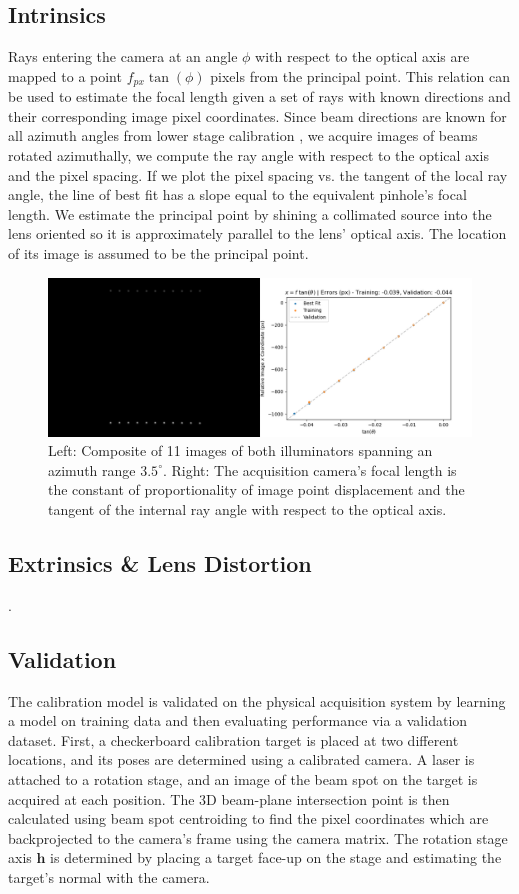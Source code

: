 \subsection{Intrinsics}
Rays entering the camera at an angle $\phi$ with respect to the optical axis are mapped to a point $f_{px} \tan(\phi)$ pixels from the principal point. This relation can be used to estimate the focal length given a set of rays with known directions and their corresponding image pixel coordinates. Since beam directions are known for all azimuth angles from lower stage calibration , we acquire images of beams rotated azimuthally, we compute the ray angle with respect to the optical axis and the pixel spacing. If we plot the pixel spacing vs. the tangent of the local ray angle, the line of best fit has a slope equal to the equivalent pinhole's focal length. We estimate the principal point by shining a collimated source into the lens oriented so it is approximately parallel to the lens' optical axis. The location of its image is assumed to be the principal point.
\begin{figure}
    \centering
    \includegraphics[width=0.75\linewidth]{figures/focal_length_estimate.png}
    \caption{Left: Composite of 11 images of both illuminators spanning an azimuth range $3.5^\circ$. Right: The acquisition camera's focal length is the constant of proportionality of image point displacement and the tangent of the internal ray angle with respect to the optical axis.}
    \label{fig:focal_length_estimate}
\end{figure}

\subsection{Extrinsics \& Lens Distortion}
.

\subsection{Validation}
The calibration model is validated on the physical acquisition system by learning a model on training data and then evaluating performance via a validation dataset. First, a checkerboard calibration target is placed at two different locations, and its poses are determined using a calibrated camera. A laser is attached to a rotation stage, and an image of the beam spot on the target is acquired at each position. The 3D beam-plane intersection point is then calculated using beam spot centroiding to find the pixel coordinates which are backprojected to the camera's frame using the camera matrix. The rotation stage axis $\mathbf{h}$ is determined by placing a target face-up on the stage and estimating the target's normal with the camera.


